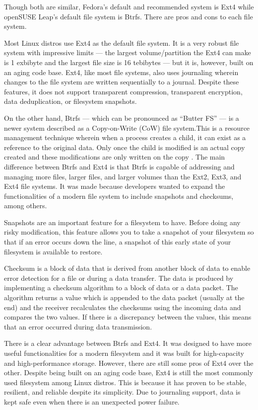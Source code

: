 \documentclass{article}
\begin{document}
Though both are similar, Fedora’s default and recommended system is Ext4 while
openSUSE Leap’s default file system is Btrfs. There are pros and cons to each
file system.

Most Linux distros use Ext4 as the default file system. It is a very robust file
system with impressive limits --- the largest volume/partition the Ext4 can make
is 1 exbibyte and the largest file size is 16 tebibytes --- but it is, however,
built on an aging code base. Ext4, like most file systems, also uses journaling
wherein changes to the file system are written sequentially to a journal.
Despite these features, it does not support transparent compression, transparent
encryption, data deduplication, or filesystem snapshots.
\parencite{ext4}

On the other hand, Btrfs --- which can be pronounced as “Butter FS” --- is a
newer system described as a Copy-on-Write (CoW) file system.This is a resource
management technique wherein when a process creates a child, it can exist as a
reference to the original data. Only once the child is modified is an actual
copy created and these modifications are only written on the copy
\parencite{cow}. The main difference between Btrfs and Ext4 is that Btrfs is
capable of addressing and managing more files, larger files, and larger volumes
than the Ext2, Ext3, and Ext4 file systems. It was made because developers
wanted to expand the functionalities of a modern file system to include
snapshots and checksums, among others. \parencite{ext4}

Snapshots are an important feature for a filesystem to have. Before doing any
risky modification, this feature allows you to take a snapshot of your
filesystem so that if an error occurs down the line, a snapshot of this early
state of your filesystem is available to restore. \parencite{shovon_1969}

Checksum is a block of data that is derived from another block of data to enable
error detection for a file or during a data transfer. The data is produced by
implementing a checksum algorithm to a block of data or a data packet. The
algorithm returns a value which is appended to the data packet (usually at the
end) and the receiver recalculates the checksums using the incoming data and
compares the two values. If there is a discrepancy between the values, this
means that an error occurred during data transmission. \parencite{isaac}

There is a clear advantage between Btrfs and Ext4. It was designed to have more
useful functionalities for a modern filesystem and it was built for
high-capacity and high-performance storage. However, there are still some pros
of Ext4 over the other. Despite being built on an aging code base, Ext4 is still
the most commonly used filesystem among Linux distros. This is because it has
proven to be stable, resilient, and reliable despite its simplicity. Due to
journaling support, data is kept safe even when there is an unexpected power
failure.
\end{document}
